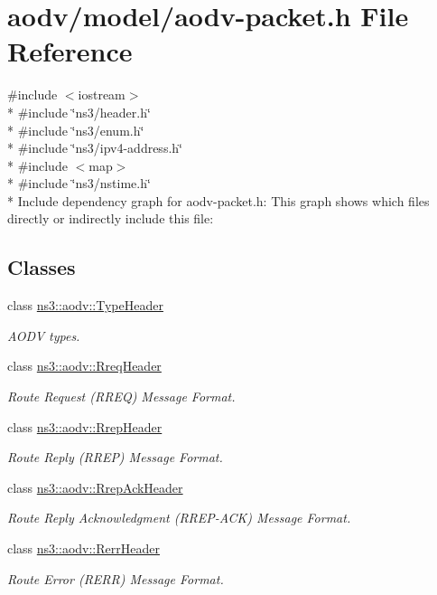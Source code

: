 \hypertarget{aodv-packet_8h}{}\section{aodv/model/aodv-\/packet.h File Reference}
\label{aodv-packet_8h}
{\ttfamily \#include $<$iostream$>$}\\*
{\ttfamily \#include \char`\"{}ns3/header.\+h\char`\"{}}\\*
{\ttfamily \#include \char`\"{}ns3/enum.\+h\char`\"{}}\\*
{\ttfamily \#include \char`\"{}ns3/ipv4-\/address.\+h\char`\"{}}\\*
{\ttfamily \#include $<$map$>$}\\*
{\ttfamily \#include \char`\"{}ns3/nstime.\+h\char`\"{}}\\*
Include dependency graph for aodv-\/packet.h\+:
This graph shows which files directly or indirectly include this file\+:
\subsection*{Classes}
\begin{DoxyCompactItemize}
\item 
class \hyperlink{classns3_1_1aodv_1_1TypeHeader}{ns3\+::aodv\+::\+Type\+Header}
\begin{DoxyCompactList}\small\item\em A\+O\+DV types. \end{DoxyCompactList}\item 
class \hyperlink{classns3_1_1aodv_1_1RreqHeader}{ns3\+::aodv\+::\+Rreq\+Header}
\begin{DoxyCompactList}\small\item\em Route Request (R\+R\+EQ) Message Format. \end{DoxyCompactList}\item 
class \hyperlink{classns3_1_1aodv_1_1RrepHeader}{ns3\+::aodv\+::\+Rrep\+Header}
\begin{DoxyCompactList}\small\item\em Route Reply (R\+R\+EP) Message Format. \end{DoxyCompactList}\item 
class \hyperlink{classns3_1_1aodv_1_1RrepAckHeader}{ns3\+::aodv\+::\+Rrep\+Ack\+Header}
\begin{DoxyCompactList}\small\item\em Route Reply Acknowledgment (R\+R\+E\+P-\/\+A\+CK) Message Format. \end{DoxyCompactList}\item 
class \hyperlink{classns3_1_1aodv_1_1RerrHeader}{ns3\+::aodv\+::\+Rerr\+Header}
\begin{DoxyCompactList}\small\item\em Route Error (R\+E\+RR) Message Format. \end{DoxyCompactList}\end{DoxyCompactItemize}

